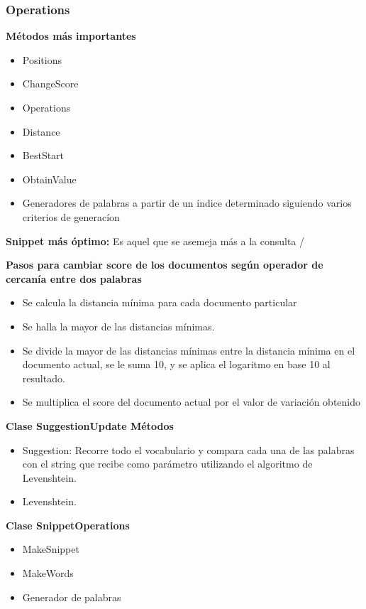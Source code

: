 \documentclass{beamer}
\begin{document}
  \begin{frame}
   \frametitle{ Operations}
   \textbf{M\'etodos m\'as importantes }
    \begin{itemize}
   	\item Positions
   	\item ChangeScore
   	\item Operations
   	\item Distance
   	\item BestStart
   	\item ObtainValue
   	\item Generadores de palabras a partir de un \'indice determinado siguiendo varios criterios de generac\'ion
   	\end{itemize} 
   \end{frame}
  
   \begin{frame}
   	
   	\textbf{Snippet m\'as \'optimo:} Es aquel que se asemeja m\'as a la consulta /
   	
   	\textbf{ Pasos para cambiar score de los documentos seg\'un operador de cercan\'ia entre dos palabras}
   	\begin{itemize} 
   	\item Se calcula la distancia m\'inima para cada documento particular
   	\item Se halla la mayor de las distancias m\'inimas.
   	\item Se divide la mayor de las distancias m\'inimas entre la distancia m\'inima en el documento actual, se le suma 10, y se aplica el logaritmo en base 10 al resultado.
   	\item Se multiplica el score del documento actual por el valor de variaci\'on obtenido
   	\end{itemize}
   
  \end{frame}


  \begin{frame}
  	\textbf{Clase SuggestionUpdate M\'etodos}
  	\begin{itemize} 
  	\item Suggestion: Recorre todo el vocabulario y compara cada una de las palabras con el string que recibe como par\'ametro utilizando el algoritmo de Levenshtein.
  	\item Levenshtein.
  	\end{itemize}
  
 
   \textbf{  Clase SnippetOperations}
  
  \begin{itemize}
  	\item MakeSnippet
  	\item MakeWords
    \item Generador de palabras
  \end{itemize} 
  
  \end{frame}
	
	
	
 
\end{document}
